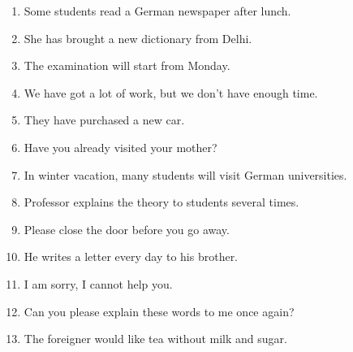 \documentclass[12pt]{article}
\begin{document}
\begin{enumerate}
\item Some students read a German newspaper after lunch.
\item She has brought a new dictionary from Delhi.
\item The examination will start from Monday.
\item We have got a lot of work, but we don't have enough time.
\item They have purchased a new car.
\item Have you already visited your mother?
\item In winter vacation, many students will visit German universities.
\item Professor explains the theory to students several times.
\item Please close the door before you go away.
\item He writes a letter every day to his brother.
\item I am sorry, I cannot help you.
\item Can you please explain these words to me once again?
\item The foreigner would like tea without milk and sugar.
\end{enumerate}
\end{document}
